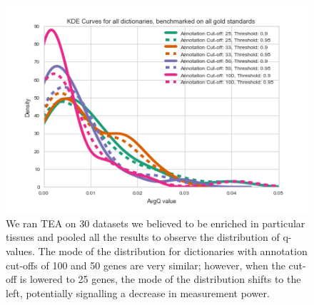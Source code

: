 \documentclass{bmcart}
\begin{document}
\begin{backmatter}
\begin{figure}[h!]
	\includegraphics[width=\textwidth]{avgQKDE_method=any.png}
  \captionsetup{width= 0.95\textwidth}
  \caption{
      We ran TEA on 30 datasets we believed to be enriched in particular tissues and pooled all the results to observe the distribution of q-values. The mode of the distribution for dictionaries with annotation cut-offs of 100 and 50 genes are very similar; however, when the cut-off is lowered to 25 genes, the mode of the distribution shifts to the left, potentially signalling a decrease in measurement power.}
	  \label{fig:qvals}
\end{figure}



\end{backmatter}
\end{document}
